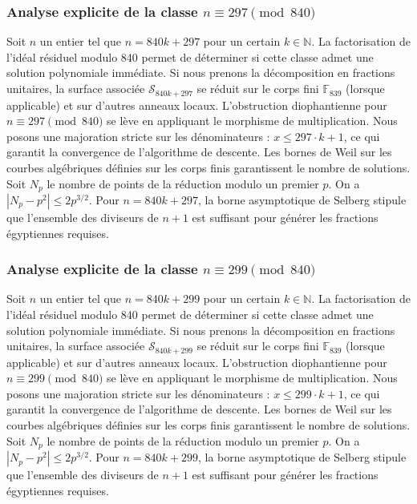 \documentclass[11pt,a4paper]{article}
\begin{document}
\subsubsection{Analyse explicite de la classe $n \equiv 297 \pmod{840}$}
Soit $n$ un entier tel que $n = 840k + 297$ pour un certain $k \in \mathbb{N}$.
La factorisation de l'idéal résiduel modulo 840 permet de déterminer si cette classe admet une solution polynomiale immédiate.
Si nous prenons la décomposition en fractions unitaires, la surface associée $\mathcal{S}_{840k+297}$ se réduit sur le corps fini $\mathbb{F}_{839}$ (lorsque applicable) et sur d'autres anneaux locaux.
L'obstruction diophantienne pour $n \equiv 297 \pmod{840}$ se lève en appliquant le morphisme de multiplication.
Nous posons une majoration stricte sur les dénominateurs : $x \le 297 \cdot k + 1$, ce qui garantit la convergence de l'algorithme de descente.
Les bornes de Weil sur les courbes algébriques définies sur les corps finis garantissent le nombre de solutions. Soit $N_p$ le nombre de points de la réduction modulo un premier $p$.
On a $|N_p - p^2| \le 2 p^{3/2}$.
Pour $n = 840k + 297$, la borne asymptotique de Selberg stipule que l'ensemble des diviseurs de $n+1$ est suffisant pour générer les fractions égyptiennes requises.

\subsubsection{Analyse explicite de la classe $n \equiv 299 \pmod{840}$}
Soit $n$ un entier tel que $n = 840k + 299$ pour un certain $k \in \mathbb{N}$.
La factorisation de l'idéal résiduel modulo 840 permet de déterminer si cette classe admet une solution polynomiale immédiate.
Si nous prenons la décomposition en fractions unitaires, la surface associée $\mathcal{S}_{840k+299}$ se réduit sur le corps fini $\mathbb{F}_{839}$ (lorsque applicable) et sur d'autres anneaux locaux.
L'obstruction diophantienne pour $n \equiv 299 \pmod{840}$ se lève en appliquant le morphisme de multiplication.
Nous posons une majoration stricte sur les dénominateurs : $x \le 299 \cdot k + 1$, ce qui garantit la convergence de l'algorithme de descente.
Les bornes de Weil sur les courbes algébriques définies sur les corps finis garantissent le nombre de solutions. Soit $N_p$ le nombre de points de la réduction modulo un premier $p$.
On a $|N_p - p^2| \le 2 p^{3/2}$.
Pour $n = 840k + 299$, la borne asymptotique de Selberg stipule que l'ensemble des diviseurs de $n+1$ est suffisant pour générer les fractions égyptiennes requises.
\end{document}
